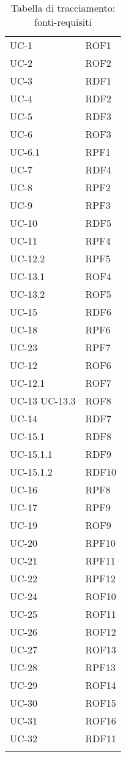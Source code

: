 \begin{longtable}{| p{5cm} | p{5cm} |}
		UC-1 & ROF1 \\
		\rowcolor{LightGray}
		UC-2 & ROF2 \\
		UC-3 & RDF1 \\
		\rowcolor{LightGray}
		UC-4 & RDF2 \\
		UC-5 & RDF3 \\
		\rowcolor{LightGray}
		UC-6 & ROF3 \\
		UC-6.1 & RPF1 \\
		\rowcolor{LightGray}
		UC-7 & RDF4 \\
		UC-8 & RPF2 \\
		\rowcolor{LightGray}
		UC-9 & RPF3 \\
		UC-10 & RDF5 \\
		\rowcolor{LightGray}
		UC-11 & RPF4 \\
		UC-12.2 & RPF5 \\
		\rowcolor{LightGray}
		UC-13.1 & ROF4 \\
		UC-13.2 & ROF5 \\
		\rowcolor{LightGray}
		UC-15 & RDF6 \\
		UC-18 & RPF6 \\
		\rowcolor{LightGray}
		UC-23 & RPF7 \\
		UC-12 & ROF6 \\
		\rowcolor{LightGray}
		UC-12.1 &ROF7 \\
		UC-13 \newline UC-13.3 & ROF8 \\
		\rowcolor{LightGray}
		UC-14 & RDF7 \\
		UC-15.1 & RDF8 \\
		\rowcolor{LightGray}
		UC-15.1.1 & RDF9 \\
		UC-15.1.2 & RDF10\\
		\rowcolor{LightGray}
		UC-16 & RPF8 \\
		UC-17 & RPF9 \\
		\rowcolor{LightGray}
		UC-19 & ROF9 \\
		UC-20 & RPF10 \\
		\rowcolor{LightGray}
		UC-21 & RPF11 \\
		UC-22 & RPF12 \\ 
		\rowcolor{LightGray}
		UC-24 & ROF10 \\
		UC-25 & ROF11 \\
		\rowcolor{LightGray}
		UC-26 & ROF12 \\
		UC-27 & ROF13 \\
		\rowcolor{LightGray}
		UC-28 & RPF13 \\
		UC-29 & ROF14 \\
		\rowcolor{LightGray}
		UC-30 & ROF15 \\
		UC-31 & ROF16 \\
		\rowcolor{LightGray}
		UC-32 & RDF11 \\
		\hline
		\caption{Tabella di tracciamento: fonti-requisiti}
\end{longtable}

